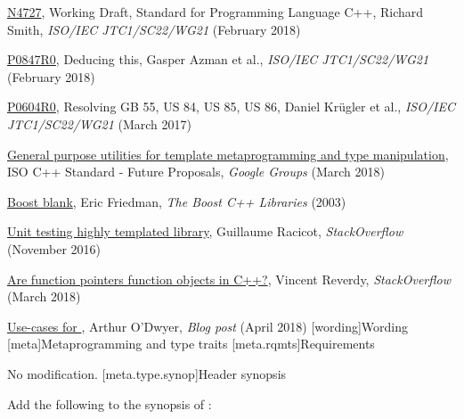 \documentclass[ebook,10pt,oneside,openany,final]{memoir}
\begin{document}
\href{http://www.open-std.org/jtc1/sc22/wg21/docs/papers/2018/n4727.pdf}{N4727}, Working Draft, Standard for Programming Language C++, Richard Smith, \emph{ISO/IEC JTC1/SC22/WG21} (February 2018)

\href{http://www.open-std.org/jtc1/sc22/wg21/docs/papers/2018/p0847r0.html}{P0847R0}, Deducing this, Gasper Azman et al., \emph{ISO/IEC JTC1/SC22/WG21} (February 2018)

\href{http://www.open-std.org/jtc1/sc22/wg21/docs/papers/2017/p0604r0.html}{P0604R0}, Resolving GB 55, US 84, US 85, US 86, Daniel Kr\"ugler et al., \emph{ISO/IEC JTC1/SC22/WG21} (March 2017)

\href{https://groups.google.com/a/isocpp.org/forum/#!topic/std-proposals/R04CWOjABIQ}{General purpose utilities for template metaprogramming and type manipulation}, ISO C++ Standard - Future Proposals, \emph{Google Groups} (March 2018)

\href{https://www.boost.org/doc/libs/1_66_0/boost/blank.hpp}{Boost blank}, Eric Friedman, \emph{The Boost C++ Libraries} (2003)

\href{https://stackoverflow.com/q/40681645}{Unit testing highly templated library}, Guillaume Racicot, \emph{StackOverflow} (November 2016)

\href{https://stackoverflow.com/q/49503229}{Are function pointers function objects in C++?}, Vincent Reverdy, \emph{StackOverflow} (March 2018)

\href{https://quuxplusone.github.io/blog/2018/04/02/false-v/}{Use-cases for }, Arthur O'Dwyer, \emph{Blog post} (April 2018)
[wording]{Wording}
[meta]{Metaprogramming and type traits}
[meta.rqmts]{Requirements}

\pnum
No modification.
[meta.type.synop]{Header  synopsis}

\pnum
Add the following to the synopsis of :
\end{document}
